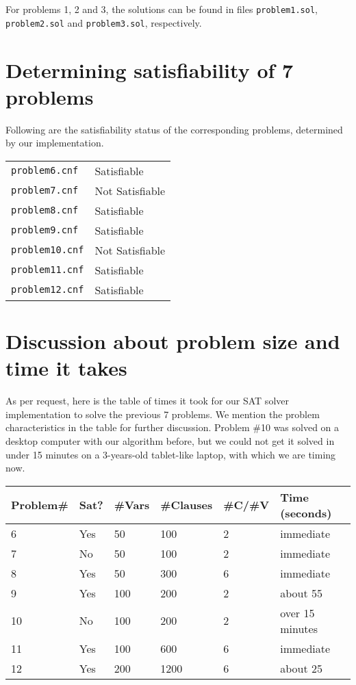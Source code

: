 \documentclass{article}
\begin{document}
For problems 1, 2 and 3, the solutions can be found
in files \texttt{problem1.sol}, \texttt{problem2.sol}
and \texttt{problem3.sol}, respectively.

\section{Determining satisfiability of 7 problems}

Following are the satisfiability status of the
corresponding problems, determined by our implementation.

\begin{center}
    \begin{tabular}{l l}
        \texttt{problem6.cnf}  & Satisfiable \\
        \texttt{problem7.cnf}  & Not Satisfiable \\
        \texttt{problem8.cnf}  & Satisfiable \\
        \texttt{problem9.cnf}  & Satisfiable \\
        \texttt{problem10.cnf} & Not Satisfiable \\
        \texttt{problem11.cnf} & Satisfiable \\
        \texttt{problem12.cnf} & Satisfiable
    \end{tabular}
\end{center}

\section{Discussion about problem size and time it takes}

As per request, here is the table of times it took for our
SAT solver implementation to solve the previous 7 problems.
We mention the problem characteristics in the table for
further discussion. Problem \#10 was solved on a desktop
computer with our algorithm before, but we could not
get it solved in under 15 minutes on a 3-years-old
tablet-like laptop, with which we are timing now.

\begin{center}
    \begin{tabular}{l || l | l | l | l || l}
    Problem\#  & Sat? & \#Vars & \#Clauses & \#C/\#V & Time (seconds) \\\hline
    6          & Yes  & 50     & 100       & 2       & immediate \\
    7          & No   & 50     & 100       & 2       & immediate \\
    8          & Yes  & 50     & 300       & 6       & immediate \\
    9          & Yes  & 100    & 200       & 2       & about 55 \\
    10         & No   & 100    & 200       & 2       & over 15 minutes \\
    11         & Yes  & 100    & 600       & 6       & immediate \\
    12         & Yes  & 200    & 1200      & 6       & about 25
    \end{tabular}
\end{center}
\end{document}
